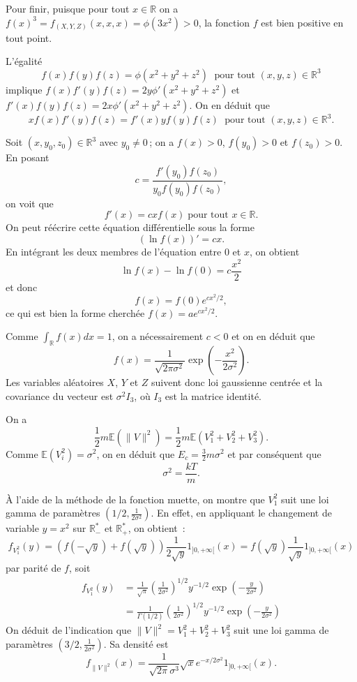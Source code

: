 Pour finir, puisque pour tout \(x \in \mathbb{R}\) on a
\(f(x)^3 = f_{(X, Y, Z)}(x, x, x) = \phi(3 x^2) > 0\), la fonction \(f\)
est bien positive en tout point.

\label{II-answer-Maxwell-2}
L'égalité
\[f(x)f(y)f(z) = \phi(x^2 + y^2 + z^2 )  \; \text{ pour tout } (x, y, z) \in \mathbb{R}^3\]
implique \(f (x)f'(y)f (z) = 2y\phi' (x^2 + y^2 + z^2 )\) et
\(f' (x)f (y)f (z) = 2x\phi' (x^2 + y^2 + z^2 ).\) On en déduit que
\[xf (x)f' (y)f (z) = f' (x)yf (y)f (z)  \; \text{ pour tout } (x, y, z) \in \mathbb{R}^3.\]

Soit \((x, y_0, z_0) \in \mathbb{R}^3\) avec \(y_0 \neq 0\)\,; on a
\(f(x) > 0\), \(f(y_0) > 0\) et \(f(z_0) > 0\). En posant \[
c = \frac{f'(y_0) f(z_0)}{y_0 f(y_0) f(z_0)},
\] on voit que
\[f' (x) = cxf(x) \; \mbox{pour tout $x \in \mathbb{R}$.}\] On peut
réécrire cette équation différentielle sous la forme \[
(\ln f(x))' = cx.
\] En intégrant les deux membres de l'équation entre \(0\) et \(x\), on
obtient \[
\ln f(x) - \ln f(0) = c\frac{x^2}{2}
\] et donc \[
f(x) = f(0) e^{c x^2/2},
\] ce qui est bien la forme cherchée \(f(x) = a e^{cx^2/2}\).

\label{II-answer-Maxwell-3}
Comme \(\int_\mathbb{R}f (x) dx = 1\), on a nécessairement \(c < 0\) et
on en déduit que
\[f (x) = \frac{1}{\sqrt{2\pi \sigma^2}}\exp\left(-\frac{x^2}{2\sigma^2}\right).\]
Les variables aléatoires \(X\), \(Y\) et \(Z\) suivent donc loi
gaussienne centrée et la covariance du vecteur est \(\sigma^2 I_3\), où
\(I_3\) est la matrice identité.

\label{II-answer-Maxwell-4}
On a
\[\frac{1}{2} m\mathbb{E}(\|V \|^2 ) = \frac{1}{2} m\mathbb{E}(V_1^2 +V_2^2 + V_3^2).\]
Comme \(\mathbb{E}(V_i^2) = \sigma^2\), on en déduit que
\(E_c = \frac{3}{2}m \sigma^2\) et par conséquent que
\[\sigma^2 = \frac{kT}{m}.\]

\label{II-answer-Maxwell-5}
À l'aide de la méthode de la fonction muette, on montre que \(V_1^2\)
suit une loi gamma de paramètres \((1/2,\frac{1}{2\sigma^2})\). En
effet, en appliquant le changement de variable \(y=x^2\) sur
\(\mathbb{R}_-^\ast\) et \(\mathbb{R}_+^\ast\), on obtient~:
\[f_{V_1^2} (y) = \left(f(-\sqrt{y}) + f(\sqrt{y})\right) \frac{1}{2\sqrt{y}} 1_{]0,+\infty[}(x) = f(\sqrt{y}) \frac{1}{\sqrt{y}} 1_{]0,+\infty[}(x)\]
par parité de \(f\), soit \begin{align*}
f_{V_1^2} (y) &= \frac{1}{\sqrt{\pi}}\left(\frac{1}{2\sigma^2}\right)^{1/2} y^{-1/2} \exp\left(-\frac{y}{2\sigma^2}\right)\\
              &= \frac{1}{\Gamma(1/2)}\left(\frac{1}{2\sigma^2}\right)^{1/2} y^{-1/2} \exp\left(-\frac{y}{2\sigma^2}\right)
\end{align*} On déduit de l'indication que
\(\|V\|^2 = V_1^2 +V_2^2 + V_3^2\) suit une loi gamma de paramètres
\((3/2,\frac{1}{2\sigma^2})\). Sa densité est
\[f_{\|V\|^2}(x) = \frac{1}{\sqrt{2\pi}\sigma^3}\sqrt{x} e^{- x/2\sigma^2}1_{]0,+\infty[}(x).\]

